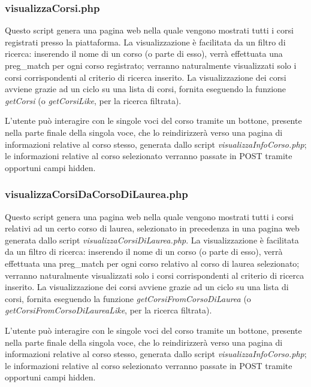 \documentclass [a4paper,11pt]{book}
\begin{document}
\medskip

\subsubsection{visualizzaCorsi.php}

Questo script genera una pagina web nella quale vengono mostrati tutti i corsi registrati presso la piattaforma. La visualizzazione è facilitata da un filtro di ricerca: inserendo il nome di un corso (o parte di esso), verrà effettuata una preg\_match per ogni corso registrato; verranno naturalmente visualizzati solo i corsi corrispondenti al criterio di ricerca inserito. La visualizzazione dei corsi avviene grazie ad un ciclo su una lista di corsi, fornita eseguendo la funzione \emph{getCorsi} (o \emph{getCorsiLike}, per la ricerca filtrata).

L'utente può interagire con le singole voci del corso tramite un bottone, presente nella parte finale della singola voce, che lo reindirizzerà verso una pagina di informazioni relative al corso stesso, generata dallo script \emph{visualizzaInfoCorso.php}; le informazioni relative al corso selezionato verranno passate in POST tramite opportuni campi hidden.

\medskip

\subsubsection{visualizzaCorsiDaCorsoDiLaurea.php}

Questo script genera una pagina web nella quale vengono mostrati tutti i corsi relativi ad un certo corso di laurea, selezionato in precedenza in una pagina web generata dallo script \emph{visualizzaCorsiDiLaurea.php}. La visualizzazione è facilitata da un filtro di ricerca: inserendo il nome di un corso (o parte di esso), verrà effettuata una preg\_match per ogni corso relativo al corso di laurea selezionato; verranno naturalmente visualizzati solo i corsi corrispondenti al criterio di ricerca inserito. La visualizzazione dei corsi avviene grazie ad un ciclo su una lista di corsi, fornita eseguendo la funzione \emph{getCorsiFromCorsoDiLaurea} (o \emph{getCorsiFromCorsoDiLaureaLike}, per la ricerca filtrata).

L'utente può interagire con le singole voci del corso tramite un bottone, presente nella parte finale della singola voce, che lo reindirizzerà verso una pagina di informazioni relative al corso stesso, generata dallo script \emph{visualizzaInfoCorso.php}; le informazioni relative al corso selezionato verranno passate in POST tramite opportuni campi hidden.
\end{document}
